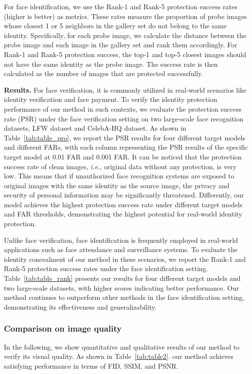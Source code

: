 \documentclass[10pt,journal,compsoc]{IEEEtran}
\begin{document}
For face identification, we use the Rank-1 and Rank-5 protection success rates (higher is better) as metrics. These rates measure the proportion of probe images whose closest 1 or 5 neighbors in the gallery set do not belong to the same identity. Specifically, for each probe image, we calculate the distance between the probe image and each image in the gallery set and rank them accordingly. For Rank-1 and Rank-5 protection success, the top-1 and top-5 closest images should not have the same identity as the probe image. The success rate is then calculated as the number of images that are protected successfully.

\textbf{Results.} 
For face verification, it is commonly utilized in real-world scenarios like identity verification and face payment. To verify the identity protection performance of our method in such contexts, we evaluate the protection success rate (PSR) under the face verification setting on two large-scale face recognition datasets, LFW dataset and CelebA-HQ dataset. As shown in Table~\ref{tab:table_pro}, we report the PSR results for four different target models and different FARs, with each column representing the PSR results of the specific target model at 0.01 FAR and 0.001 FAR. It can be noticed that the protection success rate of clean images, \emph{i.e.}, original data without any protection, is very low. This means that if unauthorized face recognition systems are exposed to original images with the same identity as the source image, the privacy and security of personal information may be significantly threatened. Differently, our model achieves the highest protection success rate under different target models and FAR thresholds, demonstrating the highest potential for real-world identity protection.

Unlike face verification, face identification is frequently employed in real-world applications such as face attendance and surveillance systems. To evaluate the identity concealment of our method in these scenarios, we report the Rank-1 and Rank-5 protection success rates under the face identification setting. Table~\ref{tab:table_rank} presents our results for four different target models and two large-scale datasets, with higher scores indicating better performance. Our method continues to outperform other methods in the face identification setting, demonstrating its effectiveness and generalizability.

\subsubsection{Comparison on image quality}
In the following, we show quantitative and qualitative results of our method to verify its visual quality. As shown in Table~\ref{tab:table2}. our method achieves satisfying performance in terms of FID, SSIM, and PSNR. 
\end{document}
